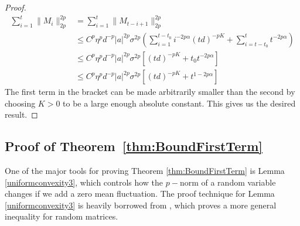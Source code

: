 \documentclass[11pt, reqno,english]{amsart}
\begin{document}
\begin{proof}
\begin{align*}
    \sum_{i = 1}^t \|M_{i}\|^{2p}_{2p} &= \sum_{i = 1}^t \|M_{t-i+1}\|^{2p}_{2p}
    \\
    &\leq C^p\eta^p d^{-p}|a|^{2p}\sigma^{2p}(\sum_{i = 1}^{t-t_0} i^{-2p\alpha}(td)^{-pK} + \sum_{i = t-t_0}^tt^{-2p\alpha})
    \\
    &\leq C^p\eta^p d^{-p}|a|^{2p}\sigma^{2p}[(td)^{-pK} + t_0 t^{-2p\alpha}]
    \\
    &\leq C^p\eta^p d^{-p}|a|^{2p}\sigma^{2p}[(td)^{-pK} + t^{1-2p\alpha}]
\end{align*}
The first term in the bracket can be made arbitrarily smaller than the second by choosing $K  > 0$ to be a large enough absolute constant. This gives us the desired result.
\end{proof}


\subsection{Proof of Theorem~\ref{thm:BoundFirstTerm}}\label{first-term}
One of the major tools for proving Theorem \ref{thm:BoundFirstTerm} is Lemma \ref{uniformconvexity3}, which controls how the $p-$norm of a random variable changes if we add a zero mean fluctuation. The proof technique for Lemma \ref{uniformconvexity3} is heavily borrowed from \cite{huang2022matrix}, which proves a more general inequality for random matrices.
\end{document}
